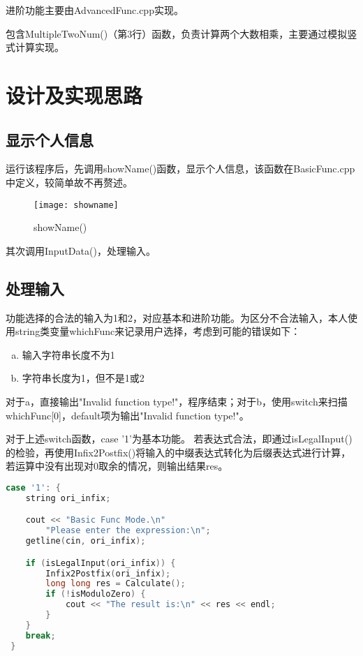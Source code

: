 \documentclass[a4paper, 11pt, UTF8]{ctexart}
\begin{document}
进阶功能主要由AdvancedFunc.cpp实现。

包含MultipleTwoNum()（第3行）函数，负责计算两个大数相乘，主要通过模拟竖式计算实现。

\section{设计及实现思路}

\subsection{显示个人信息}

运行该程序后，先调用showName()函数，显示个人信息，该函数在BasicFunc.cpp中定义，较简单故不再赘述。

\begin{figure}[H]
    \centering
    \texttt{[image: showname]}
    \caption{showName()}
\end{figure}

其次调用InputData()，处理输入。

\subsection{处理输入}

功能选择的合法的输入为1和2，对应基本和进阶功能。为区分不合法输入，本人使用string类变量whichFunc来记录用户选择，考虑到可能的错误如下：

\begin{enumerate}[a)]
    \item 输入字符串长度不为1
    \item 字符串长度为1，但不是1或2
\end{enumerate}

对于a，直接输出"Invalid function type!"，程序结束；对于b，使用switch来扫描whichFunc[0]，default项为输出"Invalid function type!"。

对于上述switch函数，case '1'为基本功能。
若表达式合法，即通过isLegalInput()的检验，再使用Infix2Postfix()将输入的中缀表达式转化为后缀表达式进行计算，
若运算中没有出现对0取余的情况，则输出结果res。

\begin{lstlisting}[language=C++, basicstyle=\ttfamily]
 case '1': {
    string ori_infix;

    cout << "Basic Func Mode.\n"
        "Please enter the expression:\n";
    getline(cin, ori_infix);

    if (isLegalInput(ori_infix)) {
        Infix2Postfix(ori_infix);
        long long res = Calculate();
        if (!isModuloZero) {
            cout << "The result is:\n" << res << endl;
        }
    }
    break;
 }   
\end{lstlisting}
\end{document}
